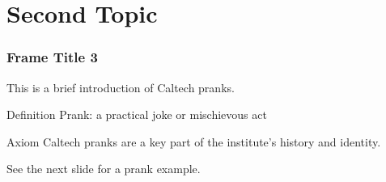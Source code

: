 \section{Second Topic}

\begin{frame}
\frametitle{Frame Title 3}

This is a brief introduction of \alert{Caltech pranks}.

\begin{block}{Definition}
Prank: a practical joke or mischievous act
\end{block}

\begin{alertblock}{Axiom}
Caltech pranks are a key part of the institute's history and identity.
\end{alertblock}

\begin{examples}
See the next slide for a prank example.
\end{examples}
\end{frame}